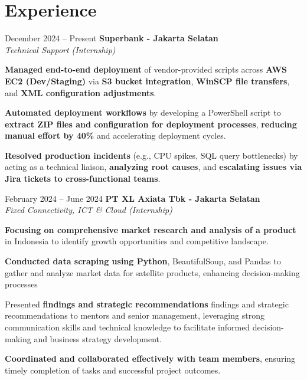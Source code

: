 \documentclass[../main.tex]{subfiles}
\begin{document}
\section{Experience}

\begin{twocolentry}{
		December 2024 – Present}
	\textbf{Superbank \color{Gray}- Jakarta Selatan}\\
	\textit{Technical Support (Internship)}
\end{twocolentry}

\vspace{0.10 cm}
\begin{onecolentry}
	\begin{highlights}
		\item \textbf{Managed end-to-end deployment} of vendor-provided scripts across \textbf{AWS EC2 (Dev/Staging)} via \textbf{S3 bucket integration}, \textbf{WinSCP file transfers}, and \textbf{XML configuration adjustments}.
		\item \textbf{Automated deployment workflows} by developing a PowerShell script to \textbf{extract ZIP files and configuration for deployment processes}, \textbf{reducing manual effort by 40\%} and accelerating deployment cycles.
		\item \textbf{Resolved production incidents} (e.g., CPU spikes, SQL query bottlenecks) by acting as a technical liaison, \textbf{analyzing root causes}, and \textbf{escalating issues via Jira tickets to cross-functional teams}.
	\end{highlights}
\end{onecolentry}

\vspace{0.40 cm}

\begin{twocolentry}{
		February 2024 – June 2024}
	\textbf{PT XL Axiata Tbk \color{Gray} - Jakarta Selatan}\\
	\textit{Fixed Connectivity, ICT \& Cloud (Internship)}
\end{twocolentry}

\vspace{0.10 cm}
\begin{onecolentry}
	\begin{highlights}
		\item \textbf{Focusing on comprehensive market research and analysis of a product} in Indonesia to identify growth opportunities and competitive landscape.
		\item \textbf{Conducted data scraping using Python}, BeautifulSoup, and Pandas to gather and analyze market data for satellite products, enhancing decision-making processes
		\item Presented \textbf{findings and strategic recommendations} findings and strategic recommendations to mentors and senior management, leveraging strong communication skills and technical knowledge to facilitate informed decision-making and business strategy development.
		\item \textbf{Coordinated and collaborated effectively with team members}, ensuring timely completion of tasks and successful project outcomes.
	\end{highlights}
\end{onecolentry}
\end{document}
